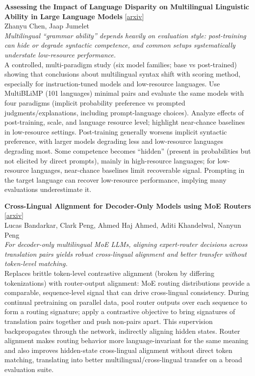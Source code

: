 \documentclass[12pt,letterpaper]{article}
\begin{document}
\medskip

{\small\textbf{Assessing the Impact of Language Disparity on Multilingual Linguistic Ability in Large Language Models}} {\scriptsize[\href{https://arxiv.org/abs/2610.00540}{arxiv}]}\\
{\scriptsize Zhanyu Chen, Jaap Jumelet}\\

{\small\textit{Multilingual ``grammar ability'' depends heavily on evaluation style: post-training can hide or degrade syntactic competence, and common setups systematically understate low-resource performance.}}\\[1pt]
{\footnotesize A controlled, multi-paradigm study (six model families; base vs post-trained) showing that conclusions about multilingual syntax shift with scoring method, especially for instruction-tuned models and low-resource languages. Use MultiBLiMP (101 languages) minimal pairs and evaluate the same models with four paradigms (implicit probability preference vs prompted judgments/explanations, including prompt-language choices). Analyze effects of post-training, scale, and language resource level; highlight near-chance baselines in low-resource settings. Post-training generally worsens implicit syntactic preference, with larger models degrading less and low-resource languages degrading most. Some competence becomes ``hidden'' (present in probabilities but not elicited by direct prompts), mainly in high-resource languages; for low-resource languages, near-chance baselines limit recoverable signal. Prompting in the target language can recover low-resource performance, implying many evaluations underestimate it.}

\medskip

{\small\textbf{Cross-Lingual Alignment for Decoder-Only Models using MoE Routers}} {\scriptsize[\href{https://arxiv.org/abs/2610.01921}{arxiv}]}\\
{\scriptsize Lucas Bandarkar, Clark Peng, Ahmed Haj Ahmed, Aditi Khandelwal, Nanyun Peng}\\

{\small\textit{For decoder-only multilingual MoE LLMs, aligning expert-router decisions across translation pairs yields robust cross-lingual alignment and better transfer without token-level matching.}}\\[1pt]
{\footnotesize Replaces brittle token-level contrastive alignment (broken by differing tokenizations) with router-output alignment: MoE routing distributions provide a comparable, sequence-level signal that can drive cross-lingual consistency. During continual pretraining on parallel data, pool router outputs over each sequence to form a routing signature; apply a contrastive objective to bring signatures of translation pairs together and push non-pairs apart. This supervision backpropagates through the network, indirectly aligning hidden states. Router alignment makes routing behavior more language-invariant for the same meaning and also improves hidden-state cross-lingual alignment without direct token matching, translating into better multilingual/cross-lingual transfer on a broad evaluation suite.}
\end{document}
